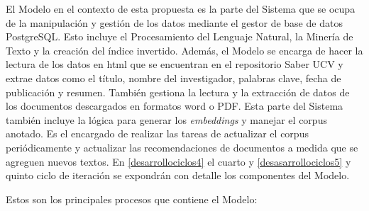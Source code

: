 \documentclass[
  10,
  openany]{book}
\begin{document}
El Modelo en el contexto de esta propuesta es la parte del Sistema que se ocupa de la manipulación y gestión de los datos mediante el gestor de base de datos PostgreSQL. Esto incluye el Procesamiento del Lenguaje Natural, la Minería de Texto y la creación del índice invertido. Además, el Modelo se encarga de hacer la lectura de los datos en html que se encuentran en el repositorio Saber UCV y extrae datos como el título, nombre del investigador, palabras clave, fecha de publicación y resumen. También gestiona la lectura y la extracción de datos de los documentos descargados en formatos word o PDF. Esta parte del Sistema también incluye la lógica para generar los \emph{embeddings} y manejar el corpus anotado. Es el encargado de realizar las tareas de actualizar el corpus periódicamente y actualizar las recomendaciones de documentos a medida que se agreguen nuevos textos. En \ref{desarrollociclos4} el cuarto y \ref{desasarrollociclos5} y quinto ciclo de iteración se expondrán con detalle los componentes del Modelo.

Estos son los principales procesos que contiene el Modelo:
\end{document}
